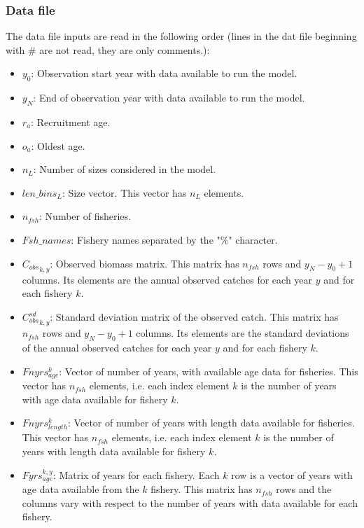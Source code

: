 \documentclass{article}
\begin{document}
\subsubsection{Data file} \label{ch: datafile}
The data file inputs are read in the following order (lines in the dat file beginning with \# are not read, they are only comments.):


\begin{itemize}

    \item $y_0$: Observation start year with data available to run the model.
    \item $y_N$: End of observation year with data available to run the model.
    \item $r_a$: Recruitment age.
    \item $o_a$: Oldest age.
    \item $n_L$: Number of sizes considered in the model.
    \item $len\_bins_L$: Size vector. This vector has $n_L$ elements.
    \item $n_{fsh}$: Number of fisheries.
    \item  $Fsh\_names$: Fishery names separated by the "\%" character.
     \item ${C_{obs}}_{k,y}$: Observed biomass matrix. This matrix has $n_{fsh}$ rows and $y_N-y_0 + 1$ columns. Its elements are the annual observed catches for each year $y$ and for each fishery $k$.
    \item ${C^{sd}_{obs}}_{k,y}$: Standard deviation matrix of the observed catch. This matrix has $n_{fsh}$ rows and $y_N-y_0 + 1$ columns. Its elements are the standard deviations of the annual observed catches for each year $y$ and for each fishery $k$.
    
    \item $Fnyrs^k_{age}$: Vector of number of years, with available age data for fisheries. This vector has $n_{fsh}$ elements, i.e. each index element $k$ is the number of years with age data available for fishery $k$. 
    \item $Fnyrs^k_{length}$: Vector of number of years with length data available for fisheries. This vector has $n_{fsh}$ elements, i.e. each index element $k$ is the number of years with length data available for fishery $k$. 
    \item $Fyrs^{k,y}_{age}$:  Matrix of years for each fishery. Each $k$ row is a vector of years with age data available from the $k$ fishery. This matrix has $n_{fsh}$ rows and the columns vary with respect to the number of years with data available for each fishery.
    

\end{itemize}
\end{document}
